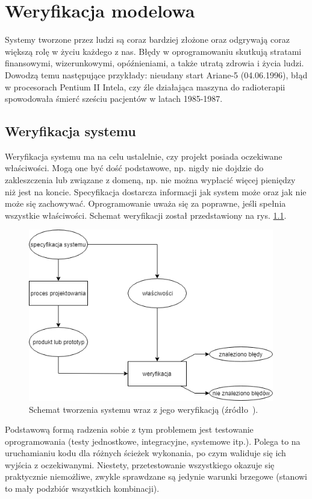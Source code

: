 \chapter{Weryfikacja modelowa}

Systemy tworzone przez ludzi są coraz bardziej złożone oraz odgrywają coraz większą rolę w życiu każdego z nas.
Błędy w oprogramowaniu skutkują stratami finansowymi, wizerunkowymi, opóźnieniami, a także utratą zdrowia i życia ludzi. Dowodzą temu następujące przykłady: nieudany start Ariane-5 (04.06.1996), błąd w procesorach Pentium II Intela, czy źle działająca maszyna do radioterapii spowodowała śmierć sześciu pacjentów w latach 1985-1987.


\section{Weryfikacja systemu}

Weryfikacja systemu ma na celu ustalelnie, czy projekt posiada oczekiwane właściwości. Mogą one być dość podstawowe, np. nigdy nie dojdzie do zakleszczenia lub związane z domeną, np. nie można wypłacić więcej pieniędzy niż jest na koncie. Specyfikacja dostarcza informacji jak system może oraz jak nie może się zachowywać. Oprogramowanie uważa się za poprawne, jeśli spełnia wszystkie właściwości. Schemat weryfikacji został przedstawiony na rys. \ref{fig:system_verification_scheme}.

\begin{figure}[h]
    \centering
    \includegraphics[height=7.5cm,keepaspectratio]{img/system_verification_schematic_view.png}
    \caption{Schemat tworzenia systemu wraz z jego weryfikacją (źródło~\cite{Bai08}).}
    \label{fig:system_verification_scheme}
\end{figure}

Podstawową formą radzenia sobie z tym problemem jest testowanie oprogramowania (testy jednostkowe, integracyjne, systemowe itp.). Polega to na uruchamianiu kodu dla różnych ścieżek wykonania, po czym waliduje się ich wyjścia z oczekiwanymi. Niestety, przetestowanie wszystkiego okazuje się praktycznie niemożliwe, zwykle sprawdzane są jedynie warunki brzegowe (stanowi to mały podzbiór wszystkich kombinacji). 


